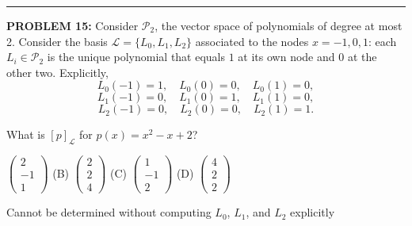 \documentclass[12pt]{amsart}
\newcommand{\divider}{
  \vspace{-1em} %
  \noindent
  \raisebox{-0.15ex}{\textbullet}%
  \hspace{0.5em}%
  \rule[0.5ex]{0.95\textwidth}{1.0pt}%
  \hspace{0.5em}%
  \raisebox{-0.15ex}{\textbullet}%
  \vspace{0em} %
}
\begin{document}
%
\divider

{\bf PROBLEM 15:}
%
Consider $\mathcal{P}_2$, the vector space of polynomials of degree at most 2. Consider the basis $\mathcal{L} = \{L_0, L_1, L_2\}$ associated to the nodes $x = -1, 0, 1$: each $L_i \in \mathcal{P}_2$ is the unique polynomial that equals $1$ at its own node and $0$ at the other two. Explicitly,
$$L_0(-1) = 1, \quad L_0(0) = 0, \quad L_0(1) = 0,$$
$$L_1(-1) = 0, \quad L_1(0) = 1, \quad L_1(1) = 0,$$
$$L_2(-1) = 0, \quad L_2(0) = 0, \quad L_2(1) = 1.$$

What is $[p]_\mathcal{L}$ for $p(x) = x^2 - x + 2$?
\vspace{0.15in}

\begin{enumerate}[(A)]
\begin{minipage}{\textwidth}
\item $\begin{pmatrix} 2 \\ -1 \\ 1 \end{pmatrix}$ \hfill
(B) $\begin{pmatrix} 2 \\ 2 \\ 4 \end{pmatrix}$ \hfill
(C) $\begin{pmatrix} 1 \\ -1 \\ 2 \end{pmatrix}$ \hfill
(D) $\begin{pmatrix} 4 \\ 2 \\ 2 \end{pmatrix}$ \hfill\mbox{}
\end{minipage}
\item[(E)] Cannot be determined without computing $L_0$, $L_1$, and $L_2$ explicitly
\end{enumerate}
\end{document}
